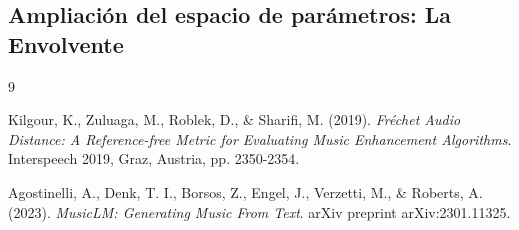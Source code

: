 \documentclass[12pt, a4paper]{article}
\begin{document}
\subsection{Ampliación del espacio de parámetros: La Envolvente}

\vspace{2cm} %
\begin{thebibliography}{9}

Kilgour, K., Zuluaga, M., Roblek, D., \& Sharifi, M. (2019). 
\textit{Fréchet Audio Distance: A Reference-free Metric for Evaluating Music Enhancement Algorithms}. 
Interspeech 2019, Graz, Austria, pp. 2350-2354.

Agostinelli, A., Denk, T. I., Borsos, Z., Engel, J., Verzetti, M., \& Roberts, A. (2023). 
\textit{MusicLM: Generating Music From Text}. 
arXiv preprint arXiv:2301.11325.

\end{thebibliography}
\end{document}
